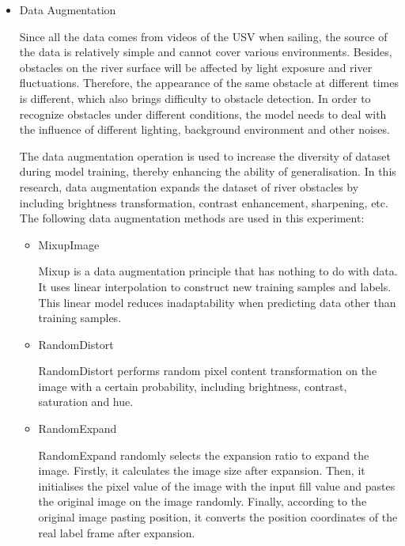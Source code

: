 \documentclass[journal,article,submit,moreauthors,pdftex]{Definitions/mdpi}
\begin{document}
\begin{itemize}
\item{Data Augmentation}


Since all the data comes from videos of the USV when sailing, the source of the data is relatively simple and cannot cover various environments. Besides, obstacles on the river surface will be affected by light exposure and river fluctuations. Therefore, the appearance of the same obstacle at different times is different, which also brings difficulty to obstacle detection. In order to recognize obstacles under different conditions, the model needs to deal with the influence of different lighting, background environment and other noises.

The data augmentation operation is used to increase the diversity of dataset during model training, thereby enhancing the ability of generalisation. In this research, data augmentation expands the dataset of river obstacles by including brightness transformation, contrast enhancement, sharpening, etc. The following data augmentation methods are used in this experiment:



\begin{itemize}
\item{MixupImage}

Mixup is a data augmentation principle that has nothing to do with data. It uses linear interpolation to construct new training samples and labels. This linear model reduces inadaptability when predicting data other than training samples.
\end{itemize}


\begin{itemize}
\item{RandomDistort}

RandomDistort performs random pixel content transformation on the image with a certain probability, including brightness, contrast, saturation and hue.

\end{itemize}

\begin{itemize}
\item{RandomExpand}

RandomExpand randomly selects the expansion ratio to expand the image. Firstly, it calculates the image size after expansion. Then, it initialises the pixel value of the image with the input fill value and pastes the original image on the image randomly. Finally, according to the original image pasting position, it converts the position coordinates of the real label frame after expansion.


\end{itemize}
\end{itemize}
\end{document}
